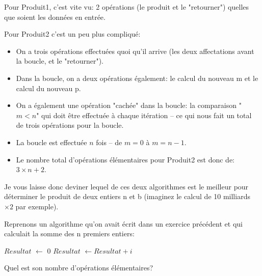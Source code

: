 \documentclass[12pt]{article}
\begin{document}
	\begin{MaReponse}
		Pour Produit1, c'est vite vu: 2 opérations (le produit et le "retourner") quelles que soient les données en entrée.
		
		Pour Produit2 c'est un peu plus compliqué:
		\begin{itemize}
			\item On a trois opérations effectuées quoi qu'il arrive (les deux affectations avant la boucle, et le "retourner").
			\item Dans la boucle, on a deux opérations également: le calcul du nouveau m et le calcul du nouveau p.
			\item On a également une opération "cachée" dans la boucle: la comparaison "$m < n$" qui doit être effectuée à chaque itération -- ce qui nous fait un total de trois opérations pour la boucle.
			\item La boucle est effectuée $n$ fois -- de $m = 0$ à $m = n - 1$.
			\item Le nombre total d'opérations élémentaires pour Produit2 est donc de: $3 \times n + 2$.
		\end{itemize}
		
		Je vous laisse donc deviner lequel de ces deux algorithmes est le meilleur pour déterminer le produit de deux entiers n et b (imaginez le calcul de 10 milliards $\times 2$ par exemple).
			
	\end{MaReponse}

		\begin{MonExo}
		Reprenons un algorithme qu'on avait écrit dans un exercice précédent et qui calculait la somme des n premiers entiers:
		
		\begin{algorithmic}
			\State $Resultat$ $\leftarrow$ 0
			\State $Resultat$ $\leftarrow Resultat + i$
			\EndFor
			\State{}
			\EndFunction
		\end{algorithmic}
		\vspace{\baselineskip}
		Quel est son nombre d'opérations élémentaires?
	\end{MonExo}
	
\end{document}
